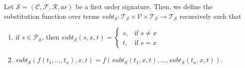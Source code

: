 \begin{definition}\label{def:sub-term}
    Let $\mathcal{S} = (\mathcal{C},\mathcal{F},\mathcal{R},ar)$ be a first order signature. Then, we define the substitution function over terms $subt_{\mathcal{S}} : \mathcal{T}_{\mathcal{S}} \times \mathcal{V} \times \mathcal{T}_{\mathcal{S}} \to \mathcal{T}_{\mathcal{S}}$ recursively such that
    \begin{enumerate}
        \item if $s \in \mathcal{P}_{\mathcal{S}}$, then $subt_{\mathcal{S}}(s,x,t) = \begin{cases}
                        s, &\text{if }s \not = x \\
                        t, &\text{if }s = x
                        \end{cases}$
        \item $subt_{\mathcal{S}}(f(t_1,...,t_n),x,t) = f(subt_{\mathcal{S}}(t_1,x,t),...,subt_{\mathcal{S}}(t_n,x,t))$.
    \end{enumerate}
\end{definition}


